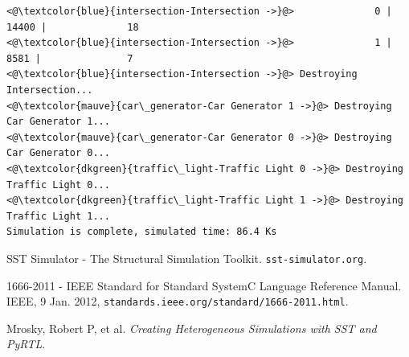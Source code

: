 \documentclass{article}
\begin{document}
\begin{lstlisting}[caption={Sample Simulation Output}, captionpos=b]
<@\textcolor{blue}{intersection-Intersection ->}@>              0 |       14400 |              18
<@\textcolor{blue}{intersection-Intersection ->}@>              1 |        8581 |               7
<@\textcolor{blue}{intersection-Intersection ->}@> Destroying Intersection...
<@\textcolor{mauve}{car\_generator-Car Generator 1 ->}@> Destroying Car Generator 1...
<@\textcolor{mauve}{car\_generator-Car Generator 0 ->}@> Destroying Car Generator 0...
<@\textcolor{dkgreen}{traffic\_light-Traffic Light 0 ->}@> Destroying Traffic Light 0...
<@\textcolor{dkgreen}{traffic\_light-Traffic Light 1 ->}@> Destroying Traffic Light 1...
Simulation is complete, simulated time: 86.4 Ks
\end{lstlisting}

  \begin{thebibliography}{5}

     SST Simulator - The Structural Simulation Toolkit. \texttt{sst-simulator.org}.

     1666-2011 - IEEE Standard for Standard SystemC Language Reference Manual. IEEE, 9
    Jan. 2012, \texttt{standards.ieee.org/standard/1666-2011.html}.

     Mrosky, Robert P, et al.
    \textit{Creating Heterogeneous Simulations with SST and PyRTL}.

  \end{thebibliography}
\end{document}
